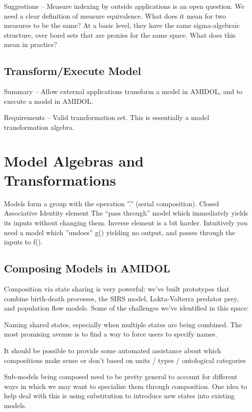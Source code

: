 \documentclass[12pt]{galois-whitepaper}
\begin{document}
Suggestions – Measure indexing by outside applications is an open question.  We need a clear definition of measure equivalence.  What does it mean for two measures to be the same?  At a basic level, they have the same sigma-algebraic structure, over borel sets that are proxies for the same space.  What does this mean in practice?

\subsection{Transform/Execute Model}

Summary – Allow external applications transform a model in AMIDOL, and to execute a model in AMIDOL.

Requirements – Valid transformation set.  This is essentially a model transformation algebra.

\section{Model Algebras and Transformations}

Models form a group with the operation ”.” (serial composition).
Closed
Associative
Identity element
The “pass through” model which immediately yields its inputs without changing them.
Inverse element is a bit harder.
Intuitively you need a model which ”undoes” g() yielding no output, and passes through the inputs to f().



\subsection{Composing Models in AMIDOL}

Composition via state sharing is very powerful: we’ve built prototypes that combine birth-death processes, the SIRS model, Lokta-Volterra predator prey, and population flow models. Some of the challenges we’ve identified in this space:

Naming shared states, especially when multiple states are being combined. The most promising avenue is to find a way to force users to specify names.

It should be possible to provide some automated assistance about which compositions make sense or don’t based on units / types / ontological categories

Sub-models being composed need to be pretty general to account for different ways in which we may want to specialize them through composition. One idea to help deal with this is using substitution to introduce new states into existing models.
\end{document}

